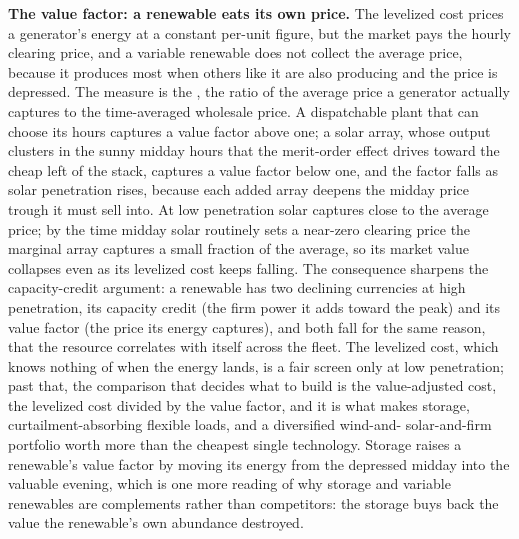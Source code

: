 \begin{mastery}
\textbf{The value factor: a renewable eats its own price.} The levelized
cost prices a generator's energy at a constant per-unit figure, but the
market pays the hourly clearing price, and a variable renewable does not
collect the average price, because it produces most when others like it are
also producing and the price is depressed. The measure is the
, the ratio of the average price a generator actually
captures to the time-averaged wholesale price. A dispatchable plant that can
choose its hours captures a value factor above one; a solar array, whose
output clusters in the sunny midday hours that the merit-order effect drives
toward the cheap left of the stack, captures a value factor below one, and
the factor falls as solar penetration rises, because each added array
deepens the midday price trough it must sell into. At low penetration solar
captures close to the average price; by the time midday solar routinely sets
a near-zero clearing price the marginal array captures a small fraction of
the average, so its market value collapses even as its levelized cost keeps
falling. The consequence sharpens the capacity-credit argument: a renewable
has two declining currencies at high penetration, its capacity credit (the
firm power it adds toward the peak) and its value factor (the price its
energy captures), and both fall for the same reason, that the resource
correlates with itself across the fleet. The levelized cost, which knows
nothing of when the energy lands, is a fair screen only at low penetration;
past that, the comparison that decides what to build is the value-adjusted
cost, the levelized cost divided by the value factor, and it is what makes
storage, curtailment-absorbing flexible loads, and a diversified wind-and-
solar-and-firm portfolio worth more than the cheapest single technology.
Storage raises a renewable's value factor by moving its energy from the
depressed midday into the valuable evening, which is one more reading of why
storage and variable renewables are complements rather than competitors:
the storage buys back the value the renewable's own abundance destroyed.
\end{mastery}

